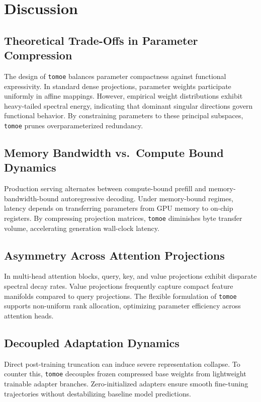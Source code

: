 \section{Discussion}

\subsection{Theoretical Trade-Offs in Parameter Compression}
The design of \texttt{tomoe} balances parameter compactness against functional expressivity. In standard dense projections, parameter weights participate uniformly in affine mappings. However, empirical weight distributions exhibit heavy-tailed spectral energy, indicating that dominant singular directions govern functional behavior. By constraining parameters to these principal subspaces, \texttt{tomoe} prunes overparameterized redundancy.

\subsection{Memory Bandwidth vs.\ Compute Bound Dynamics}
Production serving alternates between compute-bound prefill and memory-bandwidth-bound autoregressive decoding. Under memory-bound regimes, latency depends on transferring parameters from GPU memory to on-chip registers. By compressing projection matrices, \texttt{tomoe} diminishes byte transfer volume, accelerating generation wall-clock latency.

\subsection{Asymmetry Across Attention Projections}
In multi-head attention blocks, query, key, and value projections exhibit disparate spectral decay rates. Value projections frequently capture compact feature manifolds compared to query projections. The flexible formulation of \texttt{tomoe} supports non-uniform rank allocation, optimizing parameter efficiency across attention heads.

\subsection{Decoupled Adaptation Dynamics}
Direct post-training truncation can induce severe representation collapse. To counter this, \texttt{tomoe} decouples frozen compressed base weights from lightweight trainable adapter branches. Zero-initialized adapters ensure smooth fine-tuning trajectories without destabilizing baseline model predictions.


